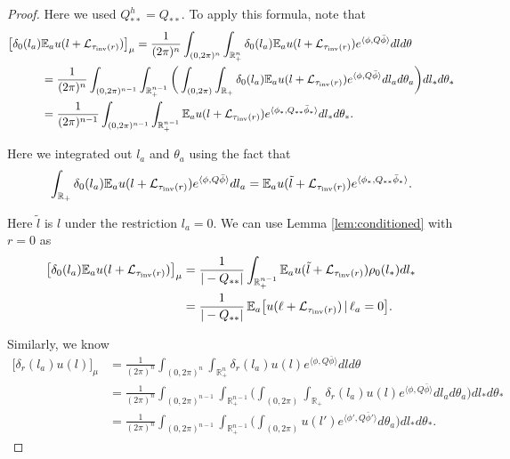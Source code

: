\documentclass[a4paper, 11pt]{article}
\newcommand{\E}{\mathbb{E}}
\newcommand{\Ell}{\mathcal{L}}
\newcommand{\inv}{\tau_\textnormal{inv}}
\begin{document}
\begin{proof}
Here we used $Q_{**}^h=Q_{**}$. To apply this formula, note that
\begin{equation*}
\begin{aligned}
\big[ \delta_0(l_a) & \E_a u(l+\Ell_{\inv(r)})\big]_\mu
=\frac{1}{(2\pi)^n}\int_{(0,2\pi)^{n}}\int_{\mathbb{R}_+^{n}} \delta_0(l_a)\E_a u(l+\Ell_{\inv(r)}) e^{\langle \phi,Q\bar{\phi}\rangle}dld\theta\\
&=\frac{1}{(2\pi)^n}\int_{(0,2\pi)^{n-1}}\int_{\mathbb{R}_+^{n-1}} \bigg(\int_{(0,2\pi)}\int_{\mathbb{R}_+} \delta_0(l_a)\E_a u(l+\Ell_{\inv(r)}) e^{\langle \phi,Q\bar{\phi}\rangle}dl_ad\theta_a \bigg)dl_*d\theta_*\\
&=\frac{1}{(2\pi)^{n-1}}\int_{(0,2\pi)^{n-1}}\int_{\mathbb{R}_+^{n-1}} \E_a u(l+\Ell_{\inv(r)}) e^{\langle \phi_*,Q_{**}\bar{\phi}_*\rangle}dl_*d\theta_*.\\
\end{aligned}
\end{equation*}

Here we integrated out $l_a$ and $\theta_a$ using the fact that
\[\int_{\mathbb{R}_+} \delta_0(l_a)\E_a u(l+\Ell_{\inv(r)}) e^{\langle \phi,Q\bar{\phi}\rangle}dl_a= \E_a u(\tilde{l}+\Ell_{\inv(r)}) e^{\langle \phi_*,Q_{**}\bar{\phi}_*\rangle}.\]

Here $\tilde{l}$ is $l$ under the restriction $l_a=0$. We can use Lemma \ref{lem:conditioned} with $r=0$ as
\begin{equation*}
\begin{aligned}
\big[ \delta_0(l_a) \E_a u(l+\Ell_{\inv(r)})\big]_\mu
&=\frac{1}{|-Q_{**}|}\int_{\mathbb{R}_+^{n-1}} \E_a u(\tilde{l}+\Ell_{\inv(r)})\rho_0(l_*)dl_*\\
&=\frac{1}{|-Q_{**}|}\,\E_a\big[ u(\ell+\Ell_{\inv(r)})\,|\,\ell_a=0\big].
\end{aligned}
\end{equation*}

Similarly, we know
\begin{equation*}
\begin{aligned}
\big[ \delta_r(l_a)  u(l)\big]_\mu
&=\frac{1}{(2\pi)^n}\int_{(0,2\pi)^{n}}\int_{\mathbb{R}_+^{n}} \delta_r(l_a)u(l) e^{\langle \phi,Q\bar{\phi}\rangle}dld\theta\\
&=\frac{1}{(2\pi)^n}\int_{(0,2\pi)^{n-1}}\int_{\mathbb{R}_+^{n-1}} \bigg(\int_{(0,2\pi)}\int_{\mathbb{R}_+} \delta_r(l_a)u(l) e^{\langle \phi,Q\bar{\phi}\rangle}dl_ad\theta_a \bigg)dl_*d\theta_*\\
&=\frac{1}{(2\pi)^n}\int_{(0,2\pi)^{n-1}}\int_{\mathbb{R}_+^{n-1}} \bigg(\int_{(0,2\pi)} u(l') e^{\langle \phi',Q\bar{\phi}'\rangle}d\theta_a \bigg)dl_*d\theta_*.
\end{aligned}
\end{equation*}


\end{proof}
\end{document}
